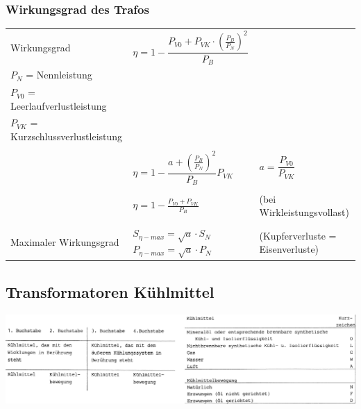 		\subsubsection{Wirkungsgrad des Trafos}
			\begin{tabular}{p{5cm}p{7cm}p{7cm}}
            	Wirkungsgrad &
            		$\eta = 1-\dfrac{P_{V0} + P_{VK} \cdot
            		(\frac{P_B}{P_N})^2}{P_B} $ &
            	\begin{minipage}{7cm}
                	$P_B$ = Betriebsnennleistung\\
                	$P_{N}$ = Nennleistung\\
                	$P_{V0}$ = Leerlaufverlustleistung\\
                	$P_{VK}$ = Kurzschlussverlustleistung                	
                \end{minipage}\\ \\
            	 &
            		$\eta = 1 - \dfrac{a + (\frac{P_B}{P_N})^2}{P_B} P_{VK}$ &
            	\begin{minipage}{7cm}
 					$a = \dfrac{P_{V0}}{P_{VK}}$                	
                \end{minipage}\\ \\            		
            	 &
            		$\eta = 1 - \frac{P_{V0}+P_{VK}}{P_B} $ 
            		& (bei Wirkleistungsvollast) \\ \\
            	Maximaler Wirkungsgrad
            	& $S_{\eta-max} = \sqrt{a} \cdot S_N$ $P_{\eta-max} = \sqrt{a}
            	\cdot P_N$
            	& (Kupferverluste = Eisenverluste)
            \end{tabular}	

\newpage
	\subsection{Transformatoren Kühlmittel}
		\begin{center}
	    	\includegraphics[width=19cm]{bilder/Kuehlmittel.png}
	    \end{center} 

